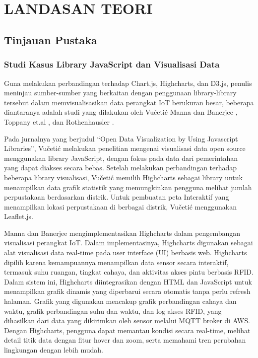 \chapter[LANDASAN TEORI]{\\ LANDASAN TEORI}

\section{Tinjauan Pustaka}
\subsection{Studi Kasus Library JavaScript dan Visualisasi Data}
Guna melakukan perbandingan terhadap Chart.js, Highcharts, dan D3.js, penulis meninjau sumber-sumber yang berkaitan dengan penggunaan library-library tersebut dalam memvisualisasikan data perangkat IoT berukuran besar, beberapa diantaranya adalah studi yang dilakukan oleh Vučetić \cite{Vueti2023} Manna dan Banerjee \cite{Manna2024}, Toppany et.al \cite{Toppany2023}, dan Rothenhausler \cite{Rothenhausler2022}.

Pada jurnalnya yang berjudul “Open Data Visualization by Using Javascript Libraries”, Vučetić \cite{Vueti2023} melakukan penelitian mengenai visualisasi data open source menggunakan library JavaScript, dengan fokus pada data dari pemerintahan yang dapat diakses secara bebas. Setelah melakukan perbandingan terhadap beberapa library visualisasi, Vučetić memilih Highcharts sebagai library untuk menampilkan data grafik statistik yang memungkinkan pengguna melihat jumlah perpustakaan berdasarkan distrik. Untuk pembuatan peta Interaktif yang menampilkan lokasi perpustakaan di berbagai distrik, Vučetić menggunakan Leaflet.js. 

Manna dan Banerjee \cite{Manna2024} mengimplementasikan Highcharts dalam pengembangan visualisasi perangkat IoT. Dalam implementasinya, Highcharts digunakan sebagai alat visualisasi data real-time pada user interface (UI) berbasis web. Highcharts dipilih karena kemampuannya menampilkan data sensor secara interaktif, termasuk suhu ruangan, tingkat cahaya, dan aktivitas akses pintu berbasis RFID. Dalam sistem ini, Highcharts diintegrasikan dengan HTML dan JavaScript untuk menampilkan grafik dinamis yang diperbarui secara otomatis tanpa perlu refresh halaman. Grafik yang digunakan mencakup grafik perbandingan cahaya dan waktu, grafik perbandingan suhu dan waktu, dan log akses RFID, yang dihasilkan dari data yang dikirimkan oleh sensor melalui MQTT broker di AWS. Dengan Highcharts, pengguna dapat memantau kondisi secara real-time, melihat detail titik data dengan fitur hover dan zoom, serta memahami tren perubahan lingkungan dengan lebih mudah.

